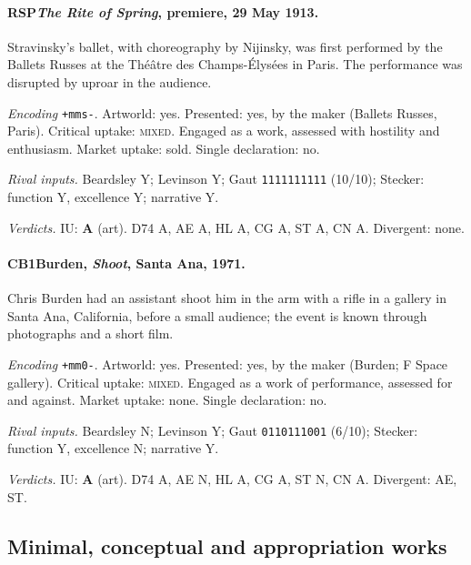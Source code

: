 \paragraph{RSP\enspace \emph{The Rite of Spring}, premiere, 29 May 1913.}
Stravinsky's ballet, with choreography by Nijinsky, was first performed by the Ballets Russes at the Th\'e\^atre des Champs-\'Elys\'ees in Paris. The performance was disrupted by uproar in the audience.\par
\noindent\textit{Encoding} \texttt{+mms-}. Artworld: yes. Presented: yes, by the maker (Ballets Russes, Paris). Critical uptake: \textsc{mixed}. Engaged as a work, assessed with hostility and enthusiasm. Market uptake: sold. Single declaration: no.\par
\noindent\textit{Rival inputs.} Beardsley Y; Levinson Y; Gaut \texttt{1111111111} (10/10); Stecker: function Y, excellence Y; narrative Y.\par
\noindent\textit{Verdicts.} IU: \textbf{A} (art). D74 A, AE A, HL A, CG A, ST A, CN A. Divergent: none.\par

\paragraph{CB1\enspace Burden, \emph{Shoot}, Santa Ana, 1971.}
Chris Burden had an assistant shoot him in the arm with a rifle in a gallery in Santa Ana, California, before a small audience; the event is known through photographs and a short film.\par
\noindent\textit{Encoding} \texttt{+mm0-}. Artworld: yes. Presented: yes, by the maker (Burden; F Space gallery). Critical uptake: \textsc{mixed}. Engaged as a work of performance, assessed for and against. Market uptake: none. Single declaration: no.\par
\noindent\textit{Rival inputs.} Beardsley N; Levinson Y; Gaut \texttt{0110111001} (6/10); Stecker: function Y, excellence N; narrative Y.\par
\noindent\textit{Verdicts.} IU: \textbf{A} (art). D74 A, AE N, HL A, CG A, ST N, CN A. Divergent: AE, ST.\par

\subsection{Minimal, conceptual and appropriation works}

